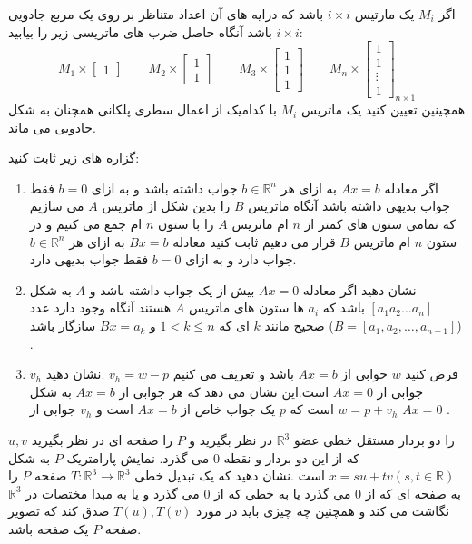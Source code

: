 \documentclass{article}
\begin{document}
اگر 
$M_i$
یک مارتیس 
$i\times i$
باشد که درایه های آن اعداد متناظر بر روی یک مربع جادویی 
$i\times i$
باشد آنگاه حاصل ضرب های ماتریسی زیر را بیابید:
$$M_1 \times
\begin{bmatrix}
1
\end{bmatrix}
\qquad M_2 \times
\begin{bmatrix}
1\\
1
\end{bmatrix}
\qquad M_3 \times
\begin{bmatrix}
1\\
1\\
1
\end{bmatrix}
\qquad M_n \times
\begin{bmatrix}
	1\\
	1\\
	\vdots\\
	1
\end{bmatrix}_{n\times1}
$$
همچینین تعیین کنید یک ماتریس 
$M_i$
با کدامیک از اعمال سطری پلکانی همچنان به شکل جادویی می ماند.


گزاره های زیر ثابت کنید:
\begin{enumerate}
\item 
	اگر معادله 
	$Ax=b$
	به ازای هر 
	$b\in \mathbb{R}^n$
	جواب داشته باشد و به ازای 
	$b=0$
	فقط جواب بدیهی داشته باشد آنگاه  ماتریس 
	$B$
	 را بدین شکل از ماتریس 
	 $A$ 
	 می سازیم که تمامی ستون های کمتر از 
	 $n$ 
	ام ماتریس 
	$A$
	 را با ستون 
	 $n$
	 ام جمع می کنیم و در  ستون 
	 $n $
	 ام ماتریس 
	 $B$
	 قرار می دهیم ثابت کنید معادله 
	 $Bx=b$
	 به ازای هر 
	 $b\in \mathbb{R}^n$
	 جواب دارد و به ازای 
	 $b=0$
	 فقط جواب بدیهی دارد.
	 \item 
	 نشان دهید اگر معادله 
	 $Ax=0$
	بیش از یک جواب داشته باشد و 
	 $A$
	 به شکل 
	 $[a_1 a_2 \ldots a_n]$
	باشد که 
	 $a_i$
	 ها ستون های ماتریس 
	 $A$
	 هستند آنگاه وجود دارد عدد صحیح مانند 
	 $k$
	 ای که 
	 $1<k\le n$
	 و 
	 $Bx=a_k$
	 سازگار باشد
	 ($B=[a_1,a_2,\ldots,a_{n-1}]$)
	 .
	 \item 
	 فرض کنید 
	 $w$
	حوابی از 
	$Ax=b$ 
	باشد و تعریف می کنیم 
	$v_h=w-p$
	.نشان دهید 
	$v_h$
	جوابی از 
	$Ax=0$
	است.این نشان می دهد که هر جوابی از 
	$Ax=b$
	به شکل 
	$w=p+v_h$
	است که 
	$p$
	یک جواب خاص از 
	$Ax=b$
	 است و 
	 $v_h$
	 جوابی از
	 $Ax=0$
	 .
	 
\end{enumerate}

$u,v$
 را دو بردار مستقل خطی عضو 
 $\mathbb{R}^3$
 در نظر بگیرید و 
 $P$
 را  صفحه ای در نظر بگیرید که از این دو بردار و نقطه 
 $0$
 می گذرد. نمایش پارامتریک 
 $P$
 به شکل 
 $x=su+tv(s,t \in \mathbb{R})$
 است .نشان دهید که یک تبدیل خطی 
 $T:\mathbb{R}^3\longrightarrow \mathbb{R}^3$
 صفحه 
 $P$
 را به صفحه ای که از 
 $0$
 می گذرد یا به خطی که از 
 $0$
 می گذرد و یا به مبدا مختصات در 
 $\mathbb{R}^3$
 نگاشت می کند و همچنین چه چیزی باید در مورد 
 $T(u),T(v)$
 صدق کند که تصویر صفحه 
 $P$
 یک صفحه باشد.
 
\end{document}
